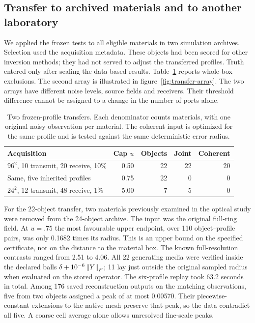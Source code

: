 \documentclass[anonymous,12pt]{iopjournal}
\theoremstyle{remark}\newtheorem{remark}[theorem]{Remark}
\numberwithin{equation}{section}
\begin{document}
\subsection{Transfer to archived materials and to another laboratory}
We applied the frozen tests to all eligible materials in two simulation archives. Selection used the acquisition metadata. These objects had been scored for other inversion methods; they had not served to adjust the transferred profiles. Truth entered only after sealing the data-based results. Table~\ref{tab:transfer} reports whole-box exclusions. The second array is illustrated in figure~\ref{fig:transfer-array}. The two arrays have different noise levels, source fields and receivers. Their threshold difference cannot be assigned to a change in the number of ports alone.

\begin{table}[tbp]
\centering\small
\caption{Two frozen-profile transfers. Each denominator counts materials, with one original noisy observation per material. The coherent input is optimized for the same profile and is tested against the same deterministic error radius.}
\label{tab:transfer}
\begin{tabular}{lrrrr}
\toprule
Acquisition & Cap $u$ & Objects & Joint & Coherent\\
\midrule
$96^2$, 10 transmit, 20 receive, 10\% & 0.50 & 22 & 22 & 20\\
Same, five inherited profiles & 0.75 & 22 & 0 & 0\\
$24^2$, 12 transmit, 48 receive, 1\% & 5.00 & 7 & 5 & 0\\
\bottomrule
\end{tabular}
\end{table}

For the 22-object transfer, two materials previously examined in the optical study were removed from the 24-object archive. The input was the original full-ring field. At $u=.75$ the most favourable upper endpoint, over 110 object--profile pairs, was only 0.1682 times its radius. This is an upper bound on the specified certificate, not on the distance to the material box. The known full-resolution contrasts ranged from 2.51 to 4.06. All 22 generating media were verified inside the declared balls $\delta+10^{-6}\left\|Y\right\|_F$; 11 lay just outside the original sampled radius when evaluated on the stored operator. The six-profile replay took 63.2 seconds in total. Among 176 saved reconstruction outputs on the matching observations, five from two objects assigned a peak of at most 0.00570. Their piecewise-constant extensions to the native mesh preserve that peak, so the data contradict all five. A coarse cell average alone allows unresolved fine-scale peaks.
\end{document}
